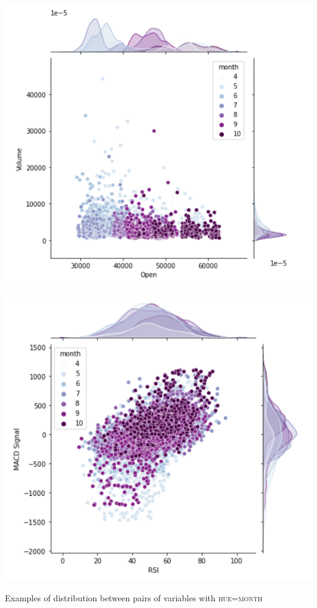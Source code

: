 \documentclass[%
12pt, %
final, %
oneside, %
onecolumn, %
centertags]{article} %
\theoremstyle{plain}
\theoremstyle{definition}
\theoremstyle{remark}
\begin{document}
\begin{center}
\includegraphics[scale=0.7]{images/mvr_Open_Volume.png}

\end{center}

\begin{center}
\includegraphics[scale=0.7]{images/mvr_RSI_MACD Signal.png}

Examples of distribution between pairs of variables with \textsc{hue=month}
\end{center}
\end{document}
